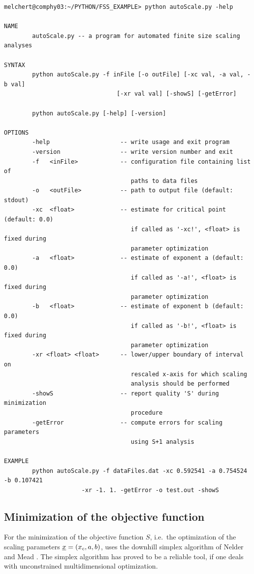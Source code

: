 \begin{lstlisting}
melchert@comphy03:~/PYTHON/FSS_EXAMPLE> python autoScale.py -help

NAME
        autoScale.py -- a program for automated finite size scaling analyses

SYNTAX
        python autoScale.py -f inFile [-o outFile] [-xc val, -a val, -b val] 
                                [-xr val val] [-showS] [-getError]

        python autoScale.py [-help] [-version]

OPTIONS
        -help                    -- write usage and exit program
        -version                 -- write version number and exit
        -f   <inFile>            -- configuration file containing list of 
                                    paths to data files
        -o   <outFile>           -- path to output file (default: stdout)
        -xc  <float>             -- estimate for critical point (default: 0.0)
                                    if called as '-xc!', <float> is fixed during 
                                    parameter optimization 
        -a   <float>             -- estimate of exponent a (default: 0.0)
                                    if called as '-a!', <float> is fixed during 
                                    parameter optimization 
        -b   <float>             -- estimate of exponent b (default: 0.0)
                                    if called as '-b!', <float> is fixed during 
                                    parameter optimization 
        -xr <float> <float>      -- lower/upper boundary of interval on 
                                    rescaled x-axis for which scaling 
                                    analysis should be performed
        -showS                   -- report quality 'S' during minimization 
                                    procedure
        -getError                -- compute errors for scaling parameters 
                                    using S+1 analysis

EXAMPLE
        python autoScale.py -f dataFiles.dat -xc 0.592541 -a 0.754524 -b 0.107421
                      -xr -1. 1. -getError -o test.out -showS

\end{lstlisting}

\subsection{Minimization of the objective function}
\label{ASAsect02subsect03}
For the minimization of the objective function $S$, i.e.\ the optimization of the 
scaling parameters ${\underline x }=(x_c,a,b)$, \myProg{} uses the downhill simplex algorithm of
Nelder and Mead \cite{ASAnelder1965}.
The simplex algorithm has proved to be a reliable tool, if one deals with unconstrained 
multidimensional optimization. 

